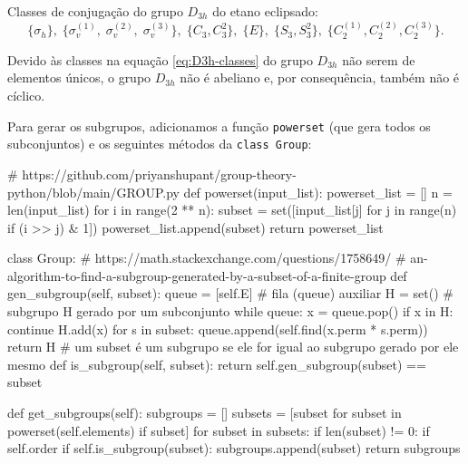 \documentclass[a4paper,10pt]{article}
\newcommand{\python}[1]{\texttt{#1}}
\begin{document}
\begin{table}[ht]
\label{tab:mult_D3h}
\end{table}

Classes de conjugação do grupo $D_{3h}$ do etano eclipsado:
\begin{equation} \label{eq:D3h-classes}
\boxed{
\{ \sigma_h \}, \;
\{ \sigma_v^{(1)}, \;
\sigma_v^{(2)}, \;
\sigma_v^{(3)} \}, \;
\{ C_3, C_3^2 \}, \;
\{ E \}, \;
\{ S_3, S_3^2 \}, \;
\{ C_2^{(1)}, C_2^{(2)}, C_2^{(3)} \}.
}
\end{equation}

Devido às classes na equação \ref{eq:D3h-classes} do grupo $D_{3h}$ não serem de elementos únicos, o grupo $D_{3h}$ não é abeliano e, por consequência, também não é cíclico.

\n

Para gerar os subgrupos, adicionamos a função \python{powerset} (que gera todos os subconjuntos) e os seguintes métodos da \python{class Group}:
\begin{Python}
# https://github.com/priyanshupant/group-theory-python/blob/main/GROUP.py
def powerset(input_list):
    powerset_list = []
    n = len(input_list)
    for i in range(2 ** n):
        subset = set([input_list[j] for j in range(n) if (i >> j) & 1])
        powerset_list.append(subset)
    return powerset_list

class Group:
    # https://math.stackexchange.com/questions/1758649/
    # an-algorithm-to-find-a-subgroup-generated-by-a-subset-of-a-finite-group
    def gen_subgroup(self, subset):
        queue = [self.E]    # fila (queue) auxiliar
        H = set()   # subgrupo H gerado por um subconjunto
        while queue:
            x = queue.pop()
            if x in H:
                continue
            H.add(x)
            for s in subset:
                queue.append(self.find(x.perm * s.perm))
        return H
    # um subset é um subgrupo se ele for igual ao subgrupo gerado por ele mesmo
    def is_subgroup(self, subset):
        return self.gen_subgroup(subset) == subset
\end{Python}

\begin{Python}
    def get_subgroups(self):
        subgroups = []
        subsets = [subset for subset in powerset(self.elements) if subset]
        for subset in subsets:
            if len(subset) != 0:
                if self.order %
                    if self.is_subgroup(subset):
                        subgroups.append(subset)
        return subgroups
\end{Python}
\end{document}
